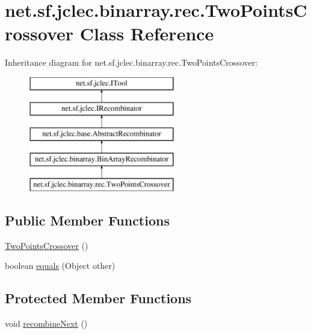 \hypertarget{classnet_1_1sf_1_1jclec_1_1binarray_1_1rec_1_1_two_points_crossover}{\section{net.\-sf.\-jclec.\-binarray.\-rec.\-Two\-Points\-Crossover Class Reference}
\label{classnet_1_1sf_1_1jclec_1_1binarray_1_1rec_1_1_two_points_crossover}
}
Inheritance diagram for net.\-sf.\-jclec.\-binarray.\-rec.\-Two\-Points\-Crossover\-:\begin{figure}[H]
\begin{center}
\leavevmode
\includegraphics[height=5.000000cm]{classnet_1_1sf_1_1jclec_1_1binarray_1_1rec_1_1_two_points_crossover}
\end{center}
\end{figure}
\subsection*{Public Member Functions}
\begin{DoxyCompactItemize}
\item 
\hyperlink{classnet_1_1sf_1_1jclec_1_1binarray_1_1rec_1_1_two_points_crossover_a1660817b4d3cd5983c0e613c5433b420}{Two\-Points\-Crossover} ()
\item 
boolean \hyperlink{classnet_1_1sf_1_1jclec_1_1binarray_1_1rec_1_1_two_points_crossover_a3a4335cdce7d3621a86143c0020d4734}{equals} (Object other)
\end{DoxyCompactItemize}
\subsection*{Protected Member Functions}
\begin{DoxyCompactItemize}
\item 
void \hyperlink{classnet_1_1sf_1_1jclec_1_1binarray_1_1rec_1_1_two_points_crossover_a6a9d4433f97cc1b01f4030e0aa8bae63}{recombine\-Next} ()
\end{DoxyCompactItemize}
